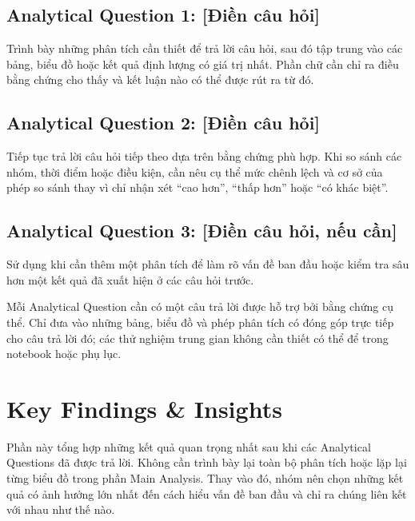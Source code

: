 \documentclass[12pt]{eDA_conquer2026}
\begin{document}
\subsection*{Analytical Question 1: [Điền câu hỏi]}

Trình bày những phân tích cần thiết để trả lời câu hỏi, sau đó tập trung vào các bảng, biểu đồ hoặc kết quả định lượng có giá trị nhất. Phần chữ cần chỉ ra điều bằng chứng cho thấy và kết luận nào có thể được rút ra từ đó.

\subsection*{Analytical Question 2: [Điền câu hỏi]}

Tiếp tục trả lời câu hỏi tiếp theo dựa trên bằng chứng phù hợp. Khi so sánh các nhóm, thời điểm hoặc điều kiện, cần nêu cụ thể mức chênh lệch và cơ sở của phép so sánh thay vì chỉ nhận xét ``cao hơn'', ``thấp hơn'' hoặc ``có khác biệt''.

\subsection*{Analytical Question 3: [Điền câu hỏi, nếu cần]}

Sử dụng khi cần thêm một phân tích để làm rõ vấn đề ban đầu hoặc kiểm tra sâu hơn một kết quả đã xuất hiện ở các câu hỏi trước.

\begin{aivncodebox}
Mỗi Analytical Question cần có một câu trả lời được hỗ trợ bởi bằng chứng cụ thể. Chỉ đưa vào những bảng, biểu đồ và phép phân tích có đóng góp trực tiếp cho câu trả lời đó; các thử nghiệm trung gian không cần thiết có thể để trong notebook hoặc phụ lục.
\end{aivncodebox}




\newpage
\section{Key Findings \& Insights}

Phần này tổng hợp những kết quả quan trọng nhất sau khi các Analytical Questions đã được trả lời. Không cần trình bày lại toàn bộ phân tích hoặc lặp lại từng biểu đồ trong phần Main Analysis. Thay vào đó, nhóm nên chọn những kết quả có ảnh hưởng lớn nhất đến cách hiểu vấn đề ban đầu và chỉ ra chúng liên kết với nhau như thế nào.
\end{document}
